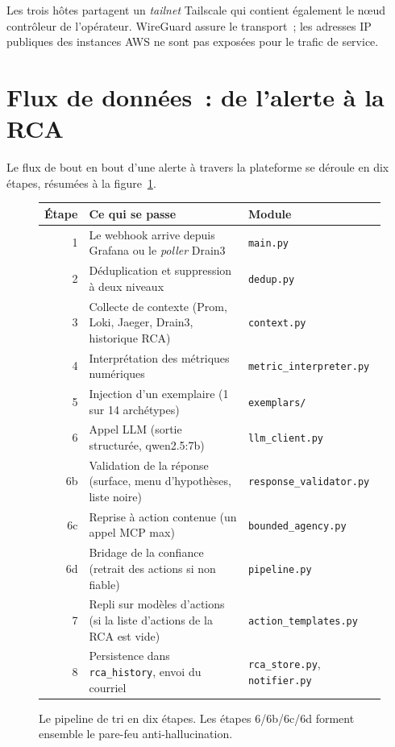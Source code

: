 \documentclass[11pt,a4paper,oneside]{report}
\begin{document}
Les trois hôtes partagent un \emph{tailnet} Tailscale qui contient
également le n\oe{}ud contrôleur de l'opérateur. WireGuard assure le
transport~; les adresses IP publiques des instances AWS ne sont pas
exposées pour le trafic de service.

\section{Flux de données~: de l'alerte à la RCA}

Le flux de bout en bout d'une alerte à travers la plateforme se
déroule en dix étapes, résumées à la figure~\ref{fig:pipeline}.

\begin{figure}[h]
\centering
\small
\begin{tabular}{|r|l|l|}
\hline
\textbf{Étape} & \textbf{Ce qui se passe} & \textbf{Module} \\
\hline
1  & Le webhook arrive depuis Grafana ou le \emph{poller} Drain3 & \texttt{main.py} \\
2  & Déduplication et suppression à deux niveaux        & \texttt{dedup.py} \\
3  & Collecte de contexte (Prom, Loki, Jaeger, Drain3, historique RCA) & \texttt{context.py} \\
4  & Interprétation des métriques numériques            & \texttt{metric\_interpreter.py} \\
5  & Injection d'un exemplaire (1 sur 14 archétypes)    & \texttt{exemplars/} \\
6  & Appel LLM (sortie structurée, qwen2.5:7b)          & \texttt{llm\_client.py} \\
6b & Validation de la réponse (surface, menu d'hypothèses, liste noire) & \texttt{response\_validator.py} \\
6c & Reprise à action contenue (un appel MCP max)        & \texttt{bounded\_agency.py} \\
6d & Bridage de la confiance (retrait des actions si non fiable) & \texttt{pipeline.py} \\
7  & Repli sur modèles d'actions (si la liste d'actions de la RCA est vide) & \texttt{action\_templates.py} \\
8  & Persistence dans \texttt{rca\_history}, envoi du courriel & \texttt{rca\_store.py}, \texttt{notifier.py} \\
\hline
\end{tabular}
\caption{Le pipeline de tri en dix étapes. Les étapes 6/6b/6c/6d
forment ensemble le pare-feu anti-hallucination.}
\label{fig:pipeline}
\end{figure}
\end{document}
